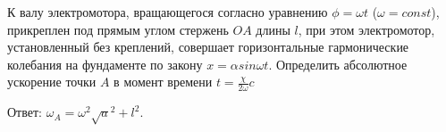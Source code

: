 К валу электромотора, вращающегося согласно уравнению $\phi= \omega t$ ($ \omega= const $), прикреплен под прямым углом 
стержень $OA$ длины $l$, при этом электромотор, установленный без креплений, совершает горизонтальные гармонические колебания на 
фундаменте по закону $x= \alpha sin \omega t$. Определить абсолютное ускорение точки $A$ в момент времени $t=\frac{\chi}{2\omega}c$

Ответ: $\omega_{A}=\omega^2 \sqrt a^2+l^2$.
